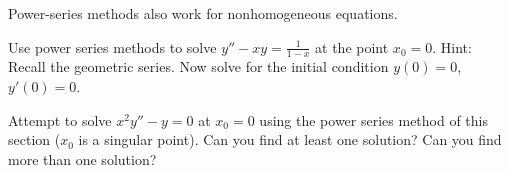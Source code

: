 \pagebreak[2]
\begin{exercise}[challenging]
Power-series methods also work for nonhomogeneous equations.
\begin{tasks}
\task Use power series methods to solve $y'' - x y = \frac{1}{1-x}$
at the point $x_0 = 0$. Hint: Recall the geometric series.
\task Now solve for the initial condition $y(0)=0$, $y'(0)=0$.
\end{tasks}
\end{exercise}

\begin{exercise}
Attempt to solve $x^2 y'' - y = 0$ at $x_0 = 0$ using the power series
method of this section ($x_0$ is a singular point).
Can you find at least one solution?  Can you find more than one solution?
\end{exercise}

